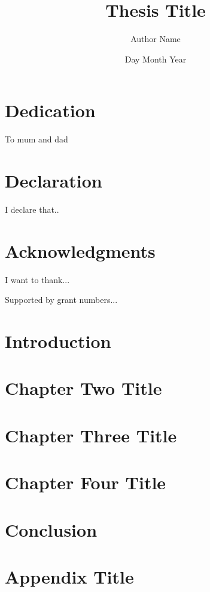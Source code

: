 \documentclass[11pt]{report}
\title{Thesis Title}
\author{Author Name}
\date{Day Month Year}
\begin{document}



\chapter*{Dedication}

To mum and dad

\chapter*{Declaration}

I declare that..

\chapter*{Acknowledgments}

I want to thank...

Supported by grant numbers...

\tableofcontents


\listoffigures


\listoftables

\doublespacing
\chapter{Introduction}


\chapter{Chapter Two Title}


\chapter{Chapter Three Title}


\chapter{Chapter Four Title}


\chapter{Conclusion}


\appendix
\chapter{Appendix Title}

\singlespacing
\printbibliography
\end{document}
